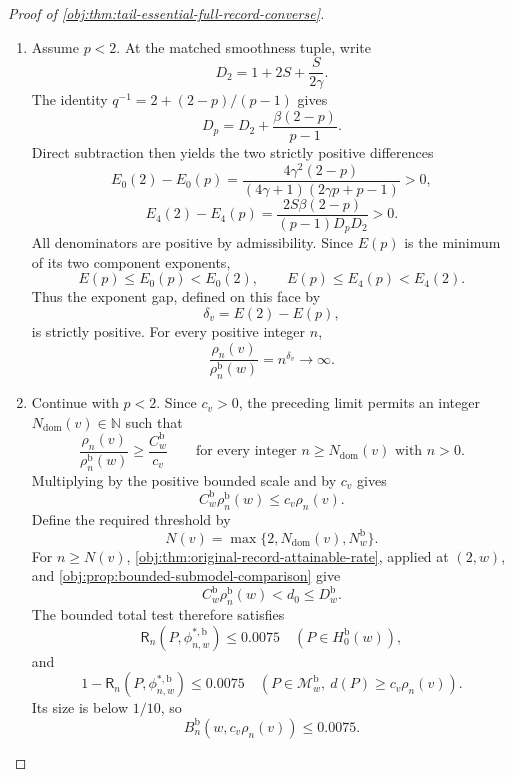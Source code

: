 \documentclass[11pt]{article}
\begin{document}
\begin{proof}[Proof of \cref{obj:thm:tail-essential-full-record-converse}]
\begin{enumerate}
When \(F(p)\ge1\), the paired-tent formula applies throughout:
\[
N=2\left\lceil n^{2q/(2\gamma+q)}\right\rceil
\ge n^{2q/(2\gamma+q)}\longrightarrow\infty,
\qquad
L_{n,v}=N^{\gamma/(p-1)}.
\]
Here \(2q/(2\gamma+q)>0\) and \(\gamma/(p-1)>0\), proving the same
divergence.

\item
Assume \(p<2\). At the matched smoothness tuple, write
\[
D_2=1+2S+\frac{S}{2\gamma}.
\]
The identity \(q^{-1}=2+(2-p)/(p-1)\) gives
\[
D_p=D_2+\frac{\beta(2-p)}{p-1}.
\]
Direct subtraction then yields the two strictly positive differences
\[
E_0(2)-E_0(p)
=
\frac{4\gamma^2(2-p)}
     {(4\gamma+1)(2\gamma p+p-1)}>0,
\]
\[
E_4(2)-E_4(p)
=
\frac{2S\beta(2-p)}
     {(p-1)D_pD_2}>0.
\]
All denominators are positive by admissibility. Since \(E(p)\) is the
minimum of its two component exponents,
\[
E(p)\le E_0(p)<E_0(2),\qquad
E(p)\le E_4(p)<E_4(2).
\]
Thus the exponent gap, defined on this face by
\[
\delta_v=E(2)-E(p),
\]
is strictly positive. For every positive integer \(n\),
\[
\frac{\rho_n(v)}{\rho_n^{\mathrm b}(w)}
=n^{\delta_v}\longrightarrow\infty.
\]

\item
Continue with \(p<2\). Since \(c_v>0\), the preceding limit permits an
integer \(N_{\mathrm{dom}}(v)\in\mathbb N\) such that
\[
\frac{\rho_n(v)}{\rho_n^{\mathrm b}(w)}
\ge\frac{C_w^{\mathrm b}}{c_v}
\qquad
\text{for every integer }n\ge N_{\mathrm{dom}}(v)\text{ with }n>0.
\]
Multiplying by the positive bounded scale and by \(c_v\) gives
\[
C_w^{\mathrm b}\rho_n^{\mathrm b}(w)\le c_v\rho_n(v).
\]
Define the required threshold by
\[
N(v)=\max\{2,N_{\mathrm{dom}}(v),N_w^{\mathrm b}\}.
\]
For \(n\ge N(v)\), \cref{obj:thm:original-record-attainable-rate}, applied
at \((2,w)\), and \cref{obj:prop:bounded-submodel-comparison} give
\[
C_w^{\mathrm b}\rho_n^{\mathrm b}(w)<d_0\le D_w^{\mathrm b}.
\]
The bounded total test therefore satisfies
\[
\mathsf R_n(P,\phi^{*,\mathrm b}_{n,w})\le0.0075
\quad(P\in H_0^{\mathrm b}(w)),
\]
and
\[
1-\mathsf R_n(P,\phi^{*,\mathrm b}_{n,w})\le0.0075
\quad
(P\in\mathcal M_w^{\mathrm b},\ d(P)\ge c_v\rho_n(v)).
\]
Its size is below \(1/10\), so
\[
B_n^{\mathrm b}(w,c_v\rho_n(v))\le0.0075.
\]


\end{enumerate}
\end{proof}
\end{document}
